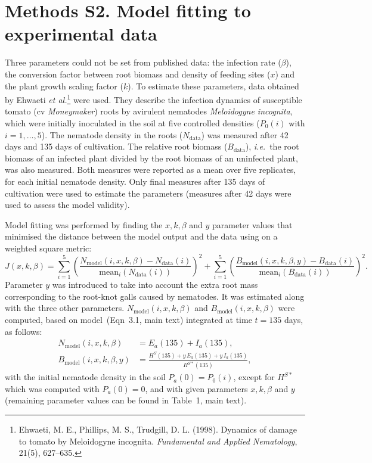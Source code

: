 \clearpage
\section{Methods S2. Model fitting to experimental data} \label{MethodsS2}

Three parameters could not be set from published data: the infection rate ($\beta$), the conversion factor between root biomass and density of feeding sites ($x$) and the plant
growth scaling factor ($k$). To estimate these parameters, data obtained by Ehwaeti \textit{et al.}\footnote{Ehwaeti, M. E., Phillips, M. S., Trudgill, D. L. (1998). Dynamics of damage to tomato by Meloidogyne incognita. \emph{Fundamental and Applied Nematology}, 21(5), 627–635.} were used. They describe the infection dynamics of susceptible tomato (cv \textit{Moneymaker}) roots by avirulent  nematodes \textit{Meloidogyne incognita}, which were initially inoculated in the soil at five controlled densities ($P_0(i)$ with $i=1,\ldots,5$). The nematode density in the roots  ($N_\text{data}$) was measured after 42 days and 135 days of cultivation. The relative root biomass ($B_\text{data}$), \textit{i.e.}\ the root biomass  of an infected plant divided by the root biomass of an uninfected plant, was also measured. Both measures were reported as a mean over five replicates, for each initial nematode density. Only final measures after 135 days of cultivation were used to estimate the parameters (measures after 42 days were used to assess the model validity).

Model fitting was performed by finding the  $x, k, \beta$ and $y$ parameter values that minimised the distance between the model output and the data using on a weighted square metric:
\begin{equation*}
J(x,k,\beta) = \sum_{i=1}^{5} \left(\dfrac{N_\text{model}(i,x,k,\beta) -N_\text{data}(i)}{\text{mean}_i(N_\text{data}(i))} \right)^2 
+\sum_{i=1}^{5}  \left(\dfrac{B_\text{model}(i,x,k,\beta,y) -B_\text{data}(i)}{\text{mean}_i(B_\text{data}(i))} \right)^2.
\end{equation*}
Parameter $y$ was introduced to take into account the extra root mass corresponding to the root-knot galls caused by nematodes. It was estimated along with the three other parameters. $N_\text{model}(i,x,k,\beta)$ and $B_\text{model}(i,x,k,\beta)$ were computed, based on model~(Eqn~3.1, main text) integrated at time $t=135$ days, as follows:
\begin{align*}
  N_\text{model}(i,x,k,\beta)&= E_a(135)+I_a(135),\\
  B_\text{model}(i,x,k,\beta,y)&= \frac{H^S(135)+y\,E_a(135)+y\,I_a(135)}{H^{S*}(135)},
\end{align*}
with the initial nematode density in the soil  $P_a(0)=P_0(i)$, except for $H^{S*}$ which was computed with $P_a(0)=0$, and with given parameters $x,k,\beta$ and $y$ (remaining parameter values can be found in Table~1, main text).

